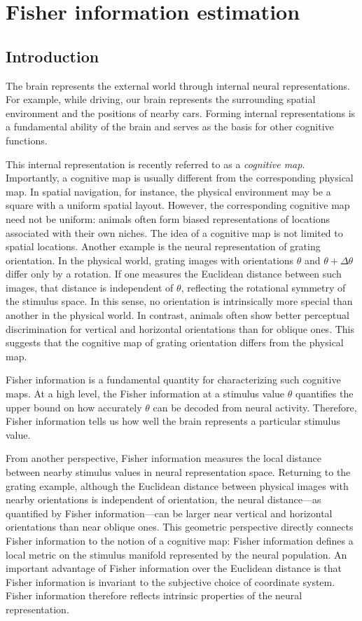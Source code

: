 \section{Fisher information estimation}
\subsection{Introduction}
The brain represents the external world through internal neural representations. For example, while driving, our brain represents the surrounding spatial environment and the positions of nearby cars. Forming internal representations is a fundamental ability of the brain and serves as the basis for other cognitive functions.

This internal representation is recently referred to as a \emph{cognitive map}. Importantly, a cognitive map is usually different from the corresponding physical map. In spatial navigation, for instance, the physical environment may be a square with a uniform spatial layout. However, the corresponding cognitive map need not be uniform: animals often form biased representations of locations associated with their own niches. The idea of a cognitive map is not limited to spatial locations. Another example is the neural representation of grating orientation. In the physical world, grating images with orientations $\theta$ and $\theta + \Delta\theta$ differ only by a rotation. If one measures the Euclidean distance between such images, that distance is independent of $\theta$, reflecting the rotational symmetry of the stimulus space. In this sense, no orientation is intrinsically more special than another in the physical world. In contrast, animals often show better perceptual discrimination for vertical and horizontal orientations than for oblique ones. This suggests that the cognitive map of grating orientation differs from the physical map.

Fisher information is a fundamental quantity for characterizing such cognitive maps. At a high level, the Fisher information at a stimulus value $\theta$ quantifies the upper bound on how accurately $\theta$ can be decoded from neural activity. Therefore, Fisher information tells us how well the brain represents a particular stimulus value.

From another perspective, Fisher information measures the local distance between nearby stimulus values in neural representation space. Returning to the grating example, although the Euclidean distance between physical images with nearby orientations is independent of orientation, the neural distance---as quantified by Fisher information---can be larger near vertical and horizontal orientations than near oblique ones. This geometric perspective directly connects Fisher information to the notion of a cognitive map: Fisher information defines a local metric on the stimulus manifold represented by the neural population. An important advantage of Fisher information over the Euclidean distance is that Fisher information is invariant to the subjective choice of coordinate system. Fisher information therefore reflects intrinsic properties of the neural representation.

